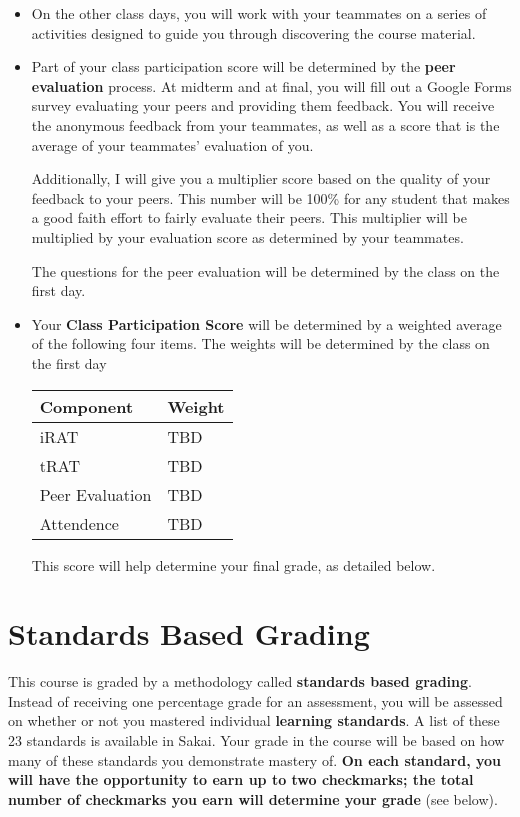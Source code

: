 \documentclass[letterpaper]{article}
\begin{document}
{\begin{itemize}
    \item On the other class days, you will work with your teammates on a series of activities designed to guide you through discovering the course material.

    \item Part of your class participation score will be determined by the {\bf peer evaluation} process.  At midterm and at final, you will fill out a Google Forms survey evaluating your peers and providing them feedback.  You will receive the anonymous feedback from your teammates, as well as a score that is the average of your teammates' evaluation of you.

    Additionally, I will give you a multiplier score based on the quality of your feedback to your peers.  This number will be 100\% for any student that makes a good faith effort to fairly evaluate their peers.  This multiplier will be multiplied by your evaluation score as determined by your teammates.

    The questions for the peer evaluation will be determined by the class on the first day.

    \item Your {\bf Class Participation Score} will be determined by a weighted average of the following four items.  The weights will be determined by the class on the first day

    \begin{center}
    \begin{tabular}{l|l}
    Component & Weight \\ \hline \hline
    iRAT & TBD \\ \hline
    tRAT & TBD\\ \hline
    Peer Evaluation & TBD \\ \hline
    Attendence & TBD\\ \hline

    \end{tabular}
    \end{center}

    This score will help determine your final grade, as detailed below.
    \end{itemize}
}

\section*{\fontsize{12}{15}\selectfont Standards Based Grading}
This course is graded by a methodology called {\bf standards based grading}.  Instead of receiving one percentage grade for an assessment, you will be assessed on whether or not you mastered individual {\bf learning standards}.  A list of these 23 standards is available in Sakai.  Your grade in the course will be based on how many of these standards you demonstrate mastery of.  {\bf On each standard, you will have the opportunity to earn up to two checkmarks; the total number of checkmarks you earn will determine your grade} (see below).
\end{document}
